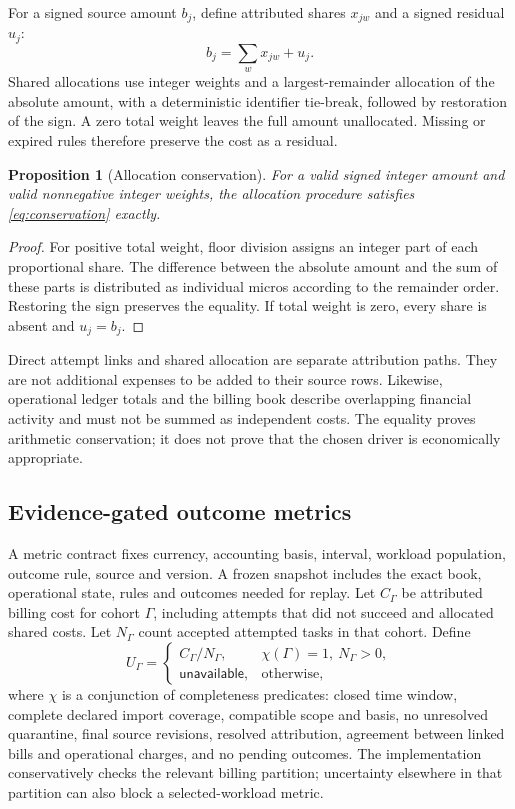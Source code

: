 \documentclass[10pt,twocolumn]{article}
\newtheorem{proposition}{Proposition}
\newcommand{\unavailable}{\mathsf{unavailable}}
\begin{document}
For a signed source amount $b_j$, define attributed shares $x_{jw}$ and a signed residual $u_j$:
\begin{equation}
b_j=\sum_w x_{jw}+u_j.
\label{eq:conservation}
\end{equation}
Shared allocations use integer weights and a largest-remainder allocation of the absolute amount, with a deterministic identifier tie-break, followed by restoration of the sign. A zero total weight leaves the full amount unallocated. Missing or expired rules therefore preserve the cost as a residual.

\begin{proposition}[Allocation conservation]
For a valid signed integer amount and valid nonnegative integer weights, the allocation procedure satisfies \cref{eq:conservation} exactly.
\end{proposition}
\begin{proof}
For positive total weight, floor division assigns an integer part of each proportional share. The difference between the absolute amount and the sum of these parts is distributed as individual micros according to the remainder order. Restoring the sign preserves the equality. If total weight is zero, every share is absent and $u_j=b_j$.
\end{proof}

Direct attempt links and shared allocation are separate attribution paths. They are not additional expenses to be added to their source rows. Likewise, operational ledger totals and the billing book describe overlapping financial activity and must not be summed as independent costs. The equality proves arithmetic conservation; it does not prove that the chosen driver is economically appropriate.

\subsection{Evidence-gated outcome metrics}

A metric contract fixes currency, accounting basis, interval, workload population, outcome rule, source and version. A frozen snapshot includes the exact book, operational state, rules and outcomes needed for replay. Let $C_\Gamma$ be attributed billing cost for cohort $\Gamma$, including attempts that did not succeed and allocated shared costs. Let $N_\Gamma$ count accepted attempted tasks in that cohort. Define
\begin{equation}
U_\Gamma=
\begin{cases}
C_\Gamma/N_\Gamma,&\chi(\Gamma)=1,\ N_\Gamma>0,\\
\unavailable,&\text{otherwise},
\end{cases}
\label{eq:metric}
\end{equation}
where $\chi$ is a conjunction of completeness predicates: closed time window, complete declared import coverage, compatible scope and basis, no unresolved quarantine, final source revisions, resolved attribution, agreement between linked bills and operational charges, and no pending outcomes. The implementation conservatively checks the relevant billing partition; uncertainty elsewhere in that partition can also block a selected-workload metric.
\end{document}
